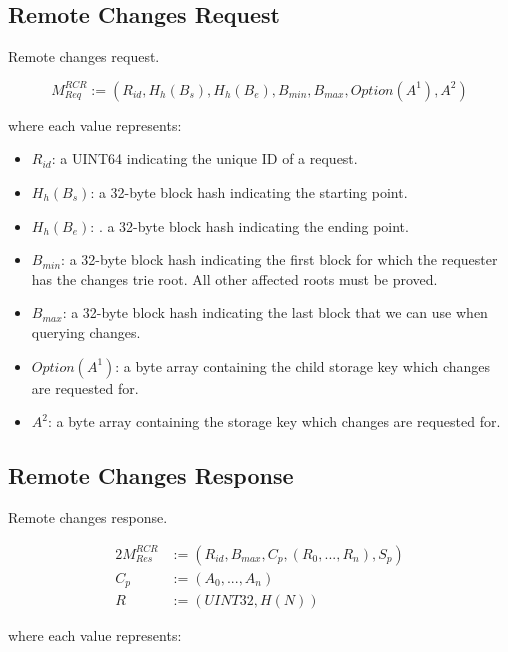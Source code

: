 \documentclass{book}
\begin{document}
\subsection{Remote Changes Request}\label{sect-remote-changes-request}

Remote changes request.

\[
    M^{RCR}_{Req} := (R_{id}, H_h(B_s), H_h(B_e), B_{min}, B_{max}, Option(A^1), A^2)
\]

where each value represents:

\begin{itemize}
    \item $R_{id}$: a UINT64 indicating the unique ID of a request.
    \item $H_h(B_s)$: a 32-byte block hash indicating the starting point.
    \item $H_h(B_e)$: . a 32-byte block hash indicating the ending point.
    \item $B_{min}$: a 32-byte block hash indicating the first block for which
    the requester has the changes trie root. All other affected roots must be
    proved.
    \item $B_{max}$: a 32-byte block hash indicating the last block that we can
    use when querying changes.
    \item $Option(A^1)$: a byte array containing the child storage key which
    changes are requested for.
    \item $A^2$: a byte array containing the storage key which changes are
    requested for.
\end{itemize}

\subsection{Remote Changes Response}

Remote changes response.

\begin{alignat*}{2}
    M^{RCR}_{Res} &:= (R_{id}, B_{max}, C_p, (R_0, ..., R_n), S_p) \\
    C_p &:= (A_0, ...,A_n) \\
    R &:= (UINT32, H(N))
\end{alignat*}

where each value represents:
\end{document}
